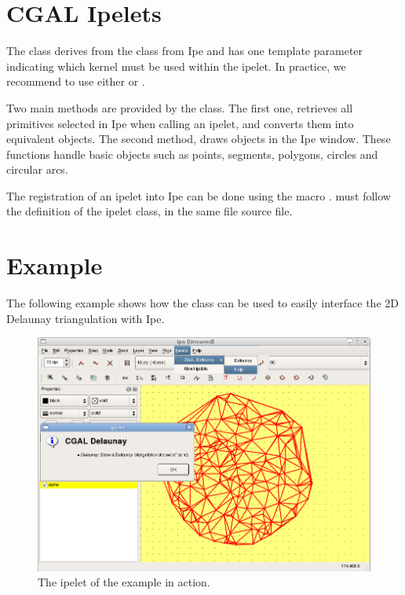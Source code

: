 \section{CGAL Ipelets\label{sec:cgal_ipelets}}

The class  derives from the class  from Ipe
and has one template parameter indicating 
which kernel must be used within the ipelet. 
In practice, we recommend to use either 
or .

Two main methods are provided by the  class.
The first one,  retrieves all
primitives selected in Ipe when calling an ipelet, and converts them into equivalent \cgal{} objects.
The second method,  draws \cgal{} objects in the Ipe
window. These functions handle basic objects such as points, segments, polygons, circles and circular arcs.

The registration of an ipelet into Ipe can be done using the macro
.  
must follow the definition of the ipelet class, in the same file source file.

\section{Example}

The following example shows how the class  can be used to easily
interface the \cgal{} 2D Delaunay triangulation with Ipe.


\begin{figure}
\centerline{\includegraphics[width=.8\textwidth]{CGAL_ipelets/fig/example}}
\caption{The ipelet of the example in action.}
\end{figure}

